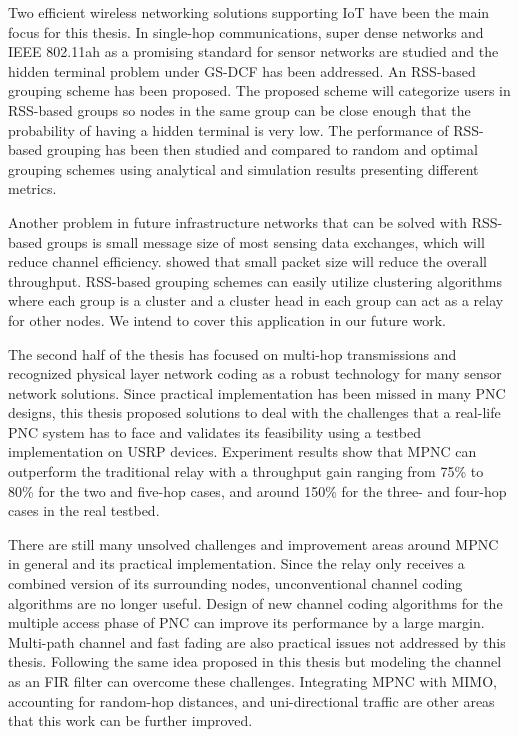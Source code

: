 \label{chapter:concl}

Two efficient wireless networking solutions supporting IoT have been the main focus for this thesis. In single-hop communications, super dense networks and IEEE 802.11ah as a promising standard for sensor networks are studied and the hidden terminal problem under GS-DCF has been addressed. An RSS-based grouping scheme has been proposed. The proposed scheme will categorize users in RSS-based groups so nodes in the same group can be close enough that the probability of having a hidden terminal is very low.
The performance of RSS-based grouping has been then studied and compared to random and optimal grouping schemes using analytical and simulation results presenting different metrics.

Another problem in future infrastructure networks that can be solved with RSS-based groups is small message size of most sensing data exchanges, which will reduce channel efficiency. \cite{bianchi2000performance} showed that small packet size will reduce the overall throughput. RSS-based grouping schemes can easily utilize clustering algorithms where each group is a cluster and a cluster head in each group can act as a relay for other nodes. We intend to cover this application in our future work.

The second half of the thesis has focused on multi-hop transmissions and recognized physical layer network coding as a robust technology for many sensor network solutions. Since practical implementation has been missed in many PNC designs, this thesis proposed solutions to deal with the challenges that a real-life PNC system has to face and validates its feasibility using a testbed implementation on USRP devices. Experiment results show that MPNC can outperform the traditional relay with a throughput gain ranging from 75\% to 80\% for the two and five-hop cases, and around 150\% for the three- and four-hop cases in the real testbed.

There are still many unsolved challenges and improvement areas around MPNC in general and its practical implementation. Since the relay only receives a combined version of its surrounding nodes, unconventional channel coding algorithms are no longer useful. Design of new channel coding algorithms for the multiple access phase of PNC can improve its performance by a large margin. Multi-path channel and fast fading are also practical issues not addressed by this thesis. Following the same idea proposed in this thesis but modeling the channel as an FIR filter can overcome these challenges. Integrating MPNC with MIMO, accounting for random-hop distances, and uni-directional traffic are other areas that this work can be further improved.